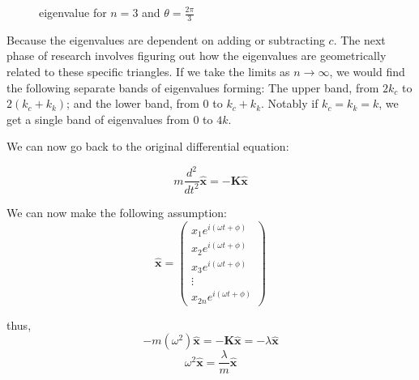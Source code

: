\documentclass[11pt]{article}
\begin{document}
\begin{figure}[H]
\begin{center}
\end{center}
\caption{eigenvalue for $n=3$ and  $\theta = \frac{2\pi}{3}$}
\end{figure}

Because the eigenvalues are dependent on adding or subtracting $c$. The next phase of research involves figuring out how the eigenvalues are geometrically related to these specific triangles. If we take the limits as $n \to \infty$, we would find the following separate bands of eigenvalues forming: The upper band, from $2k_c$ to $2(k_c + k_k)$; and the lower band, from $0$ to $k_c + k_k$. Notably if $k_c = k_k = k$, we get a single band of eigenvalues from $0$ to $4k$. 

We can now go back to the original differential equation:

\[
m \frac{d^2}{dt^2} \mathbf{\hat{x}} = - \mathbf{K \hat{x}}
\]

We can now make the following assumption:
\[
\mathbf{\hat{x}} = \begin{pmatrix}
x_1 e^{i ( \omega t + \phi )} \\
x_2 e^{i ( \omega t + \phi )} \\
x_3 e^{i ( \omega t + \phi )} \\
\vdots \\
x_{2n} e^{i (\omega t + \phi )}
\end{pmatrix}
\]

thus,
\[
-m ( \omega^2 ) \mathbf{\hat{x}} = - \mathbf{K \hat{x}} = - \lambda \mathbf{\hat{x}}
\]
\[
\omega^2 \mathbf{\hat{x}} = \frac{\lambda}{m} \mathbf{\hat{x}}
\]
\end{document}

